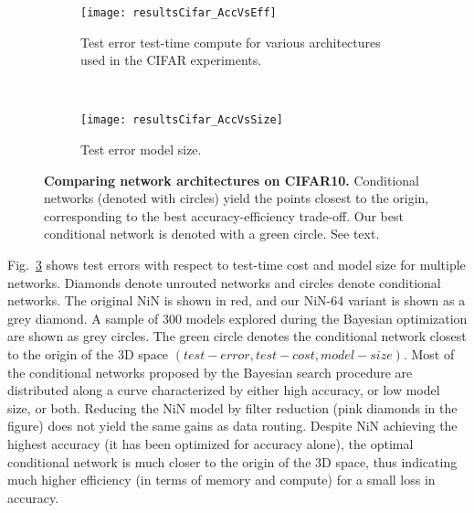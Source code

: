 \documentclass[thesis]{subfiles}
\begin{document}
\begin{figure}[htbp!] 
\centering
\begin{subfigure}[b]{\textwidth}
   \centering
   \texttt{[image: resultsCifar\_AccVsEff]}
   \caption{Test error \vs test-time compute for various architectures used in the CIFAR experiments.}
   \label{fig:resultsCifar_AccVsEff}
\end{subfigure}
~
\begin{subfigure}[b]{\textwidth}
   \centering
   \texttt{[image: resultsCifar\_AccVsSize]}
   \caption{Test error \vs model size.}
   \label{fig:resultsCifar_AccVsSize}
\end{subfigure}
\caption{{\bf Comparing network architectures on CIFAR10.} Conditional networks (denoted with circles) yield the points closest to the origin, corresponding to the best accuracy-efficiency trade-off. Our best conditional network is denoted with a green circle. See text.}
\label{fig:Cifar_results}
\end{figure}
%
Fig.~\ref{fig:Cifar_results} shows test errors with respect to test-time cost and model size for multiple networks.
Diamonds denote unrouted networks and circles denote conditional networks. 
The original NiN is shown in red, and our NiN-64 variant is shown as a grey diamond.
A sample of 300 models explored during the Bayesian optimization are shown as grey circles.
The green circle denotes the conditional network closest to the origin of the 
3D space $(test-error,test-cost,model-size)$.
Most of the conditional networks proposed by the Bayesian search procedure are distributed along a curve characterized by either high accuracy, or low model size, or both. 
Reducing the NiN model by filter reduction (pink diamonds in the figure) does not yield the same gains as data routing.
Despite NiN achieving the highest accuracy (it has been optimized for accuracy alone), the optimal conditional network is much closer to the origin of the 3D space, thus indicating much higher efficiency (in terms of memory and compute) for a small loss in accuracy.




\end{document}
